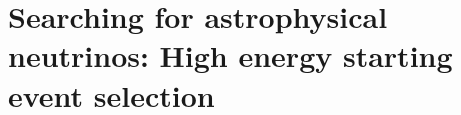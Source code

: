 \chapter{Searching for astrophysical neutrinos: High energy starting event selection}\label{chapter:selection}\label{sec:selection}

\begingroup
\graphicspath{{results/HESE_Final_Paper/}}

\endgroup